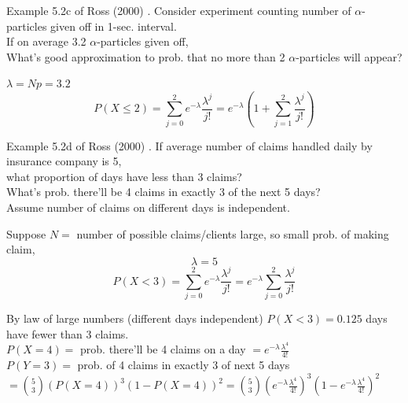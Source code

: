 Example 5.2c of Ross (2000) \cite{dgdt:Ross2000}. Consider experiment counting number of $\alpha$-particles given off in 1-sec. interval. \\
If on average 3.2 $\alpha$-particles given off, \\
What's good approximation to prob. that no more than 2 $\alpha$-particles will appear?


$\lambda = Np = 3.2$
\[
P(X\leq 2) = \sum_{j=0}^2 e^{-\lambda} \frac{\lambda^j}{j!} = e^{-\lambda} \left( 1 + \sum_{j=1}^2 \frac{ \lambda^j}{j!} \right)
\]

Example 5.2d of Ross (2000) \cite{dgdt:Ross2000}. If average number of claims handled daily by insurance company is 5, \\
what proportion of days have less than 3 claims? \\
What's prob. there'll be 4 claims in exactly 3 of the next 5 days? \\
Assume number of claims on different days is independent.


Suppose $N = $ number of possible claims/clients large, so small prob. of making claim,
\[
\lambda = 5
\]
\[
P(X< 3) = \sum_{j=0}^2 e^{-\lambda} \frac{ \lambda^j}{j!} = e^{-\lambda} \sum_{j=0}^2 \frac{\lambda^j}{j!}
\]

By law of large numbers (different days independent) $P(X < 3) = 0.125$ days have fewer than 3 claims.  \\

$P(X=4) =$ prob. there'll be 4 claims on a day $= e^{-\lambda} \frac{\lambda^4}{4!}$ \\
$P(Y=3) = $ prob. of 4 claims in exactly 3 of next 5 days $= \binom{5}{3} (P(X=4))^3 (1 - P(X=4))^2 = \binom{5}{3} (e^{-\lambda} \frac{\lambda^4 }{ 4!} )^3 (1 - e^{-\lambda} \frac{\lambda^4}{ 4!} )^2$



